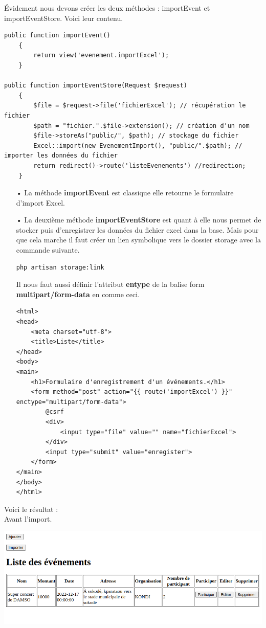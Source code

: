 \documentclass[12pt,a4paper]{article}
\begin{document}
Évidement nous devons créer les deux méthodes : importEvent et importEventStore.
Voici leur contenu.
\begin{verbatim}
public function importEvent()
    {
        return view('evenement.importExcel');
    }

public function importEventStore(Request $request)
    {
        $file = $request->file('fichierExcel'); // récupération le fichier
        $path = "fichier.".$file->extension(); // création d'un nom 
        $file->storeAs("public/", $path); // stockage du fichier
        Excel::import(new EvenementImport(), "public/".$path); // importer les données du fichier
        return redirect()->route('listeEvenements') //redirection;
    }
\end{verbatim}
\begin{itemize}
\item[•] La méthode \textbf{importEvent} est classique elle retourne le formulaire d'import Excel.
\item[•] La deuxième méthode \textbf{importEventStore} est quant à elle nous permet de stocker puis d’enregistrer les données du fichier excel dans la base. Mais pour que cela marche il faut créer un lien symbolique vers le dossier storage avec la commande suivante.
\begin{verbatim}
php artisan storage:link
\end{verbatim}
Il nous faut aussi définir l'attribut \textbf{entype} de la balise form \textbf{multipart/form-data} en comme ceci.
\begin{verbatim}
<html>
<head>
    <meta charset="utf-8">
    <title>Liste</title>
</head>
<body>
<main>
    <h1>Formulaire d'enregistrement d'un événements.</h1>
    <form method="post" action="{{ route('importExcel') }}" enctype="multipart/form-data">
        @csrf
        <div>
            <input type="file" value="" name="fichierExcel">
        </div>
        <input type="submit" value="enregister">
    </form>
</main>
</body>
</html>
\end{verbatim}
\end{itemize}
Voici le résultat : \\
Avant l'import.
\begin{center}
\includegraphics[scale=0.55]{img/before_import.png}
\end{center}
\end{document}
